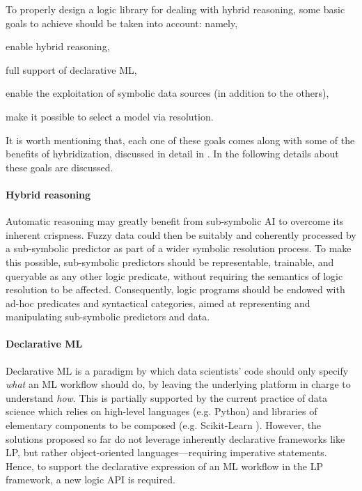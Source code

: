 \documentclass[
]{ceurart}
\begin{document}
To properly design a logic library for dealing with hybrid reasoning, some basic goals to achieve should be taken into account: namely,
%
\begin{inlinelist}
    \item enable hybrid reasoning,
    \item full support of declarative ML,
    \item enable the exploitation of symbolic data sources (in addition to the others),
    \item make it possible to select a model via resolution.
\end{inlinelist}
%
It is worth mentioning that, each one of these goals comes along with some of the benefits of hybridization, discussed in detail in \cite{xaisurvey-ia14}.
%
In the following details about these goals are discussed.

\paragraph{Hybrid reasoning}
%
Automatic reasoning may greatly benefit from sub-symbolic AI to overcome its inherent crispness.
%
Fuzzy data could then be suitably and coherently processed by a sub-symbolic predictor as part of a wider symbolic resolution process.
%
To make this possible, sub-symbolic predictors should be representable, trainable, and queryable as any other logic predicate, without requiring the semantics of logic resolution to be affected.
%
Consequently, logic programs should be endowed with ad-hoc predicates and syntactical categories, aimed at representing and manipulating sub-symbolic predictors and data.

\paragraph{Declarative ML} Declarative ML is a paradigm by which data scientists' code should only specify \emph{what} an ML workflow should do, by leaving the underlying platform in charge to understand \emph{how}.
%
This is partially supported by the current practice of data science which relies on high-level languages (e.g. Python) and libraries of elementary components to be composed (e.g. Scikit-Learn \cite{scikit-learn}).
%
However, the solutions proposed so far do not leverage inherently declarative frameworks like LP, but rather object-oriented languages---requiring imperative statements.
%
Hence, to support the declarative expression of an ML workflow in the LP framework, a new logic API is required.
%
\end{document}
